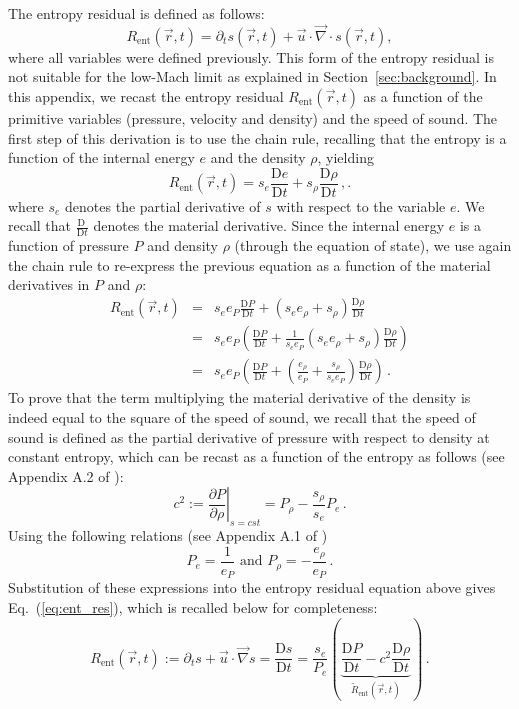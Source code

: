 \documentclass[preprint,10pt]{elsarticle}
\renewcommand{\div}{\vec{\nabla}\! \cdot \!}
\newcommand{\grad}{\vec{\nabla}}
\newcommand{\resi}{R_\text{ent}}
\newcommand{\resinew}{\widetilde{R}_\text{ent}}
\newcommand{\matder}[1]{\frac{\textrm{D} #1}{\textrm{D} t}}
\newcommand{\eqt}[1]{Eq.~(\ref{#1})}                     %
\newcommand{\sct}[1]{Section~\ref{#1}}                   %
\begin{document}
The entropy residual is defined as follows:
%
\begin{equation*}
\resi(\vec{r},t) = \partial_t s (\vec{r},t) + \vec{u} \cdot \div s (\vec{r},t) ,
\end{equation*}
%
where all variables were defined previously. This form of the entropy residual is not suitable for the low-Mach 
limit as explained in \sct{sec:background}. In this appendix, we recast the entropy residual $\resi(\vec{r},t)$ 
as a function of the primitive variables (pressure, velocity and density) and the speed of sound. The first step 
of this derivation is to use the chain rule, recalling that the entropy is a function of the internal energy $e$ 
and the density $\rho$, yielding
%
\begin{equation*}
\resi(\vec{r},t) = s_e  \matder{e} + s_{\rho}  \matder{\rho} \,,.
\end{equation*}
%
where $s_e$ denotes the partial derivative of $s$ with respect to the variable $e$. We recall that $\matder{\ }$ 
denotes the material derivative. Since the internal energy $e$ is a function of pressure $P$ and density $\rho$ 
(through the equation of state), we use again the chain rule to re-express the previous equation as a function 
of the material derivatives in $P$ and $\rho$:
%
\begin{eqnarray*}
\resi(\vec{r},t) &=&  s_e e_P \matder{P} + ( s_e e_{\rho} + s_{\rho} ) \matder{\rho} \\
&=& s_e e_P \left( \matder{P} + \frac{1}{s_e e_P} ( s_e e_{\rho} + s_{\rho} )  \matder{\rho}\right) \\
&=& s_e e_P \left( \matder{P} + ( \frac{e_{\rho}}{e_P} + \frac{s_{\rho}}{s_e e_P} )  \matder{\rho} \right) \,.
\end{eqnarray*}
%
To prove that the term multiplying the material derivative of the density is indeed equal to the square of the speed 
of sound, we recall that the speed of sound is defined as the partial derivative of pressure with respect to density 
at constant entropy, which can be recast as a function of the entropy as follows (see Appendix A.2 of \cite{jlg}):
%
\begin{equation*}
c^2 := \left. \frac{\partial P}{\partial \rho} \right|_{s=cst} = P_{\rho} - \frac{s_{\rho}}{s_e} P_e   \, .
\end{equation*}
%
Using the following relations (see Appendix A.1 of \cite{jlg})
%
\begin{equation*}
P_e = \frac{1}{e_P} \text{ and } P_{\rho} = -\frac{e_{\rho}}{e_P}  \, .
\end{equation*}
%
Substitution of these expressions into the entropy residual equation above gives \eqt{eq:ent_res}, which is recalled 
below for completeness:
%
\begin{equation*}
\resi(\vec{r},t) := \partial_t s + \vec{u} \cdot \grad s = \matder{s} = \frac{s_e}{P_e} \left( \underbrace{\matder{P} - c^2 \matder{\rho} }_{\resinew(\vec{r},t)} \right) \, .
\end{equation*} 
\end{document}
